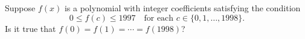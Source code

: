 Suppose $f(x)$ is a polynomial with integer coefficients satisfying the condition \[0\leq f(c)\leq1997\quad\text{for each }c\in\{0,1,\ldots,1998\}.\] Is it true that $f(0)=f(1)=\cdots=f(1998)$?
